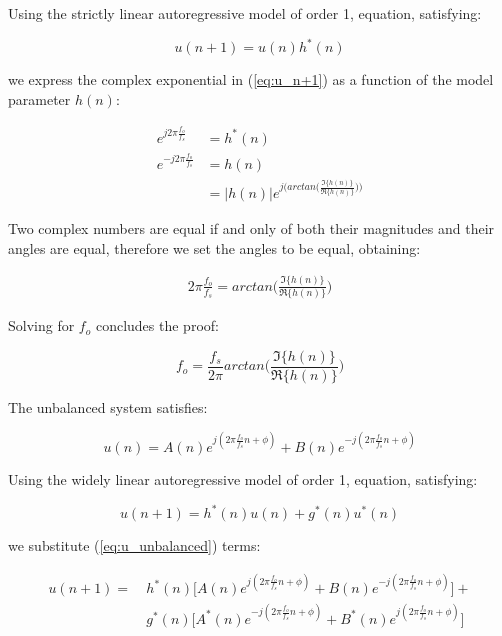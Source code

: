 \begin{enumerate}[label=\alph*), leftmargin=*]
Using the strictly linear autoregressive model of order 1, equation, satisfying:

\begin{equation}
    u(n+1) = u(n) h^{*}(n)
\end{equation}

we express the complex exponential in (\ref{eq:u_n+1}) as a function of the model parameter $h(n)$:

\begin{align}
    e^{j 2 \pi \frac{f_{o}}{f_{s}}} &= h^{*}(n) \\
    e^{-j 2 \pi \frac{f_{o}}{f_{s}}}&= h(n) \\
                                    &= | h(n) | e^{j\big( arctan \big(\frac{\Im\{h(n)\}}{\Re\{h(n)\}} \big) \big)}
\end{align}

Two complex numbers are equal if and only of both their magnitudes and their angles are equal, therefore we set the angles to be equal, obtaining:

\begin{align}
    2 \pi \frac{f_{o}}{f_{s}} = arctan \big(\frac{\Im\{h(n)\}}{\Re\{h(n)\}} \big) 
\end{align}

Solving for $f_{o}$ concludes the proof:

\begin{equation}
    f_{o} = \frac{f_{s}}{2\pi} arctan \big(\frac{\Im\{h(n)\}}{\Re\{h(n)\}} \big)
\label{proof:fo_CLMS}
\end{equation}

The unbalanced system satisfies:

\begin{equation}
    u(n) = A(n) e^{j(2\pi \frac{f_{o}}{f_{s}} n + \phi)} + B(n) e^{-j(2\pi \frac{f_{o}}{f_{s}} n + \phi)}
\label{eq:u_unbalanced}
\end{equation}

Using the widely linear autoregressive model of order 1, equation, satisfying:

\begin{equation}
    u(n+1) = h^{*}(n) u(n) + g^{*}(n) u^{*}(n)
\end{equation}

we substitute (\ref{eq:u_unbalanced}) terms:

\begin{align}
    u(n+1) =\ 
        &h^{*}(n) \bigg[ A(n) e^{j(2\pi \frac{f_{o}}{f_{s}} n + \phi)} + B(n) e^{-j(2\pi \frac{f_{o}}{f_{s}} n + \phi)} \bigg] + \nonumber\\
        &g^{*}(n) \bigg[ A^{*}(n) e^{-j(2\pi \frac{f_{o}}{f_{s}} n + \phi)} + B^{*}(n) e^{j(2\pi \frac{f_{o}}{f_{s}} n + \phi)} \bigg]
\label{eq:u_n+1_ar}
\end{align}


\end{enumerate}
